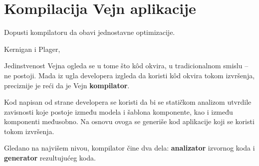 \chapter{Kompilacija Vejn aplikacije}
\label{ch:kompilacija-vejn-aplikacije}

\epigraph{
  Dopusti kompilatoru da obavi jednostavne optimizacije.
}{Kernigan i Plager, }

Jedinstvenost Vejna ogleda se u tome što kôd okvira, u tradicionalnom smislu -- ne postoji.
Mada iz ugla developera izgleda da koristi kôd okvira tokom izvršenja, preciznije je reći da je Vejn \textbf{kompilator}.

Kod napisan od strane developera se koristi da bi se statičkom analizom utvrdile zavisnosti koje postoje između modela i šablona komponente, kao i između komponenti međusobno.
Na osnovu ovoga se generiše kod aplikacije koji se koristi tokom izvršenja.

Gledano na najvišem nivou, kompilator čine dva dela: \textbf{analizator} izvornog koda i \textbf{generator} rezultujućeg koda.








